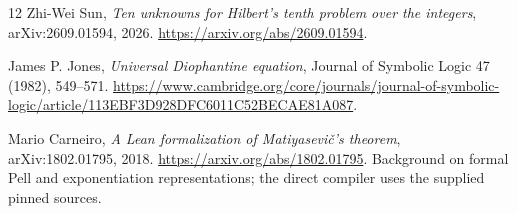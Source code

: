 \documentclass[11pt,letterpaper]{article}
\theoremstyle{remark}\newtheorem{remark}[theorem]{Remark}
\begin{document}
\begin{thebibliography}{12}
Zhi-Wei Sun, \emph{Ten unknowns for Hilbert's tenth problem over the integers},
arXiv:2609.01594, 2026. \url{https://arxiv.org/abs/2609.01594}.

James P. Jones, \emph{Universal Diophantine equation},
Journal of Symbolic Logic 47 (1982), 549--571.
\url{https://www.cambridge.org/core/journals/journal-of-symbolic-logic/article/113EBF3D928DFC6011C52BECAE81A087}.

Mario Carneiro, \emph{A Lean formalization of Matiyasevi\v{c}'s theorem},
arXiv:1802.01795, 2018. \url{https://arxiv.org/abs/1802.01795}.
Background on formal Pell and exponentiation representations;
the direct compiler uses the supplied pinned sources.
\end{thebibliography}
\end{document}
